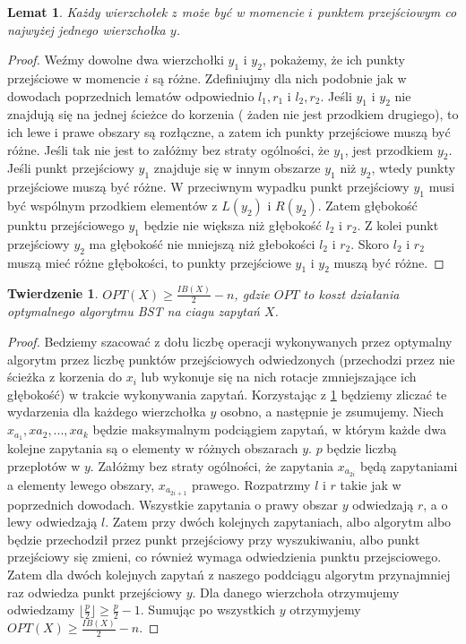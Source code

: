 \documentclass[declaration,shortabstract]{iithesis}
\theoremstyle{remark}
\theoremstyle{plain}
\newtheorem{theorem}[definition]{Twierdzenie}
\theoremstyle{plain}
\theoremstyle{plain}
\newtheorem{lemma}[definition]{Lemat}
\begin{document}
\begin{lemma}
\label{eig_trans_point}
Każdy wierzchołek $z$ może być w momencie $i$ punktem przejściowym co najwyżej jednego wierzchołka $y$.
\end{lemma}
\begin{proof}
Weźmy dowolne dwa wierzchołki $y_1$ i $y_2$, pokażemy, że ich punkty przejściowe w momencie $i$ są różne. Zdefiniujmy dla nich podobnie jak w dowodach poprzednich lematów odpowiednio $l_1, r_1$ i $l_2, r_2$. Jeśli $y_1$ i $y_2$ nie znajdują się na jednej ścieżce do korzenia ( żaden nie jest przodkiem drugiego), to ich lewe i prawe obszary są rozłączne, a zatem ich punkty przejściowe muszą być różne. Jeśli tak nie jest to załóżmy bez straty ogólności, że $y_1$, jest przodkiem $y_2$. Jeśli punkt przejściowy $y_1$ znajduje się w innym obszarze $y_1$ niż $y_2$, wtedy punkty przejściowe muszą być różne. W przeciwnym wypadku punkt przejściowy $y_1$ musi być wspólnym przodkiem elementów z $L(y_2)$ i $R(y_2)$. Zatem głębokość punktu przejściowego $y_1$ będzie nie większa niż głębokość $l_2$ i $r_2$. Z kolei punkt przejściowy $y_2$ ma głębokość nie mniejszą niż głebokości $l_2$ i $r_2$. Skoro $l_2$ i $r_2$ muszą mieć różne głębokości, to punkty przejściowe $y_1$ i $y_2$ muszą być różne.  
\end{proof}
\begin{theorem}
\label{low_bound}
\(OPT(X) \geq \frac{IB(X)}{2} - n\), gdzie $OPT$ to koszt działania optymalnego algorytmu BST na ciagu zapytań $X$.
\end{theorem}
\begin{proof}
Bedziemy szacować z dołu liczbę operacji wykonywanych przez optymalny algorytm przez liczbę punktów przejściowych odwiedzonych (przechodzi przez nie ścieżka z korzenia do $x_i$ lub wykonuje się na nich rotacje zmniejszające ich głębokość) w trakcie wykonywania zapytań. Korzystając z \ref{eig_trans_point} będziemy zliczać te  wydarzenia dla każdego wierzchołka $y$ osobno, a następnie je zsumujemy. Niech \( x_{a_1}, x{a_2}, ..., x{a_k}\) będzie maksymalnym podciągiem zapytań, w którym każde dwa kolejne zapytania są o elementy w różnych obszarach $y$. $p$ będzie liczbą przeplotów w $y$. Załóżmy bez straty ogólności, że zapytania \(x_{a_{2i}}\) będą zapytaniami a elementy lewego obszary, \(x_{a_{2i+1}}\) prawego. Rozpatrzmy $l$ i $r$ takie jak w poprzednich dowodach. Wszystkie zapytania o prawy obszar $y$ odwiedzają $r$, a o lewy odwiedzają $l$. Zatem przy dwóch kolejnych zapytaniach, albo algorytm albo będzie przechodził przez punkt przejściowy przy wyszukiwaniu, albo punkt przejściowy się zmieni, co również wymaga odwiedzienia punktu przejsciowego. Zatem dla dwóch kolejnych zapytań z naszego poddciągu algorytm przynajmniej raz odwiedza punkt przejściowy $y$. Dla danego wierzchoła otrzymujemy odwiedzamy \(\lfloor \frac{p}{2} \rfloor \geq \frac{p}{2} -1\).  Sumując po wszystkich $y$ otrzymyjemy \(OPT(X) \geq \frac{IB(X)}{2} - n\).
\end{proof}
\end{document}
